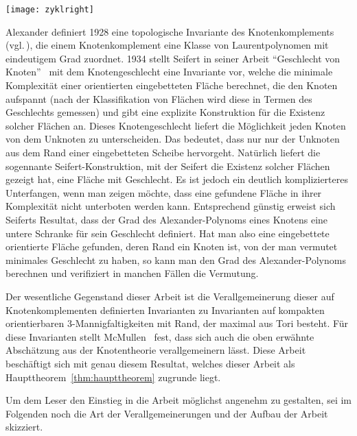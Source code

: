 	\hfill
	\begin{minipage}[t]{0.2\textwidth}
	\vfill \begin{flushright}
		\texttt{[image: zyklright]} 
	\end{flushright}
	\end{minipage}

	Alexander definiert 1928 eine topologische Invariante des Knotenkomplements (vgl.\,\cite{Alexander.1928}), die einem Knotenkomplement eine Klasse von Laurentpolynomen mit eindeutigem Grad zuordnet. 1934 stellt Seifert in seiner Arbeit "`Geschlecht von Knoten"'~\cite{Seifert.1934} mit dem Knotengeschlecht eine Invariante vor, welche die minimale Komplexität einer orientierten eingebetteten Fläche berechnet, die den Knoten aufspannt (nach der Klassifikation von Flächen wird diese in Termen des Geschlechts gemessen) und gibt eine explizite Konstruktion für die Existenz solcher Flächen an. Dieses Knotengeschlecht liefert die Möglichkeit jeden Knoten von dem Unknoten zu unterscheiden. Das bedeutet, dass nur nur der Unknoten aus dem Rand einer eingebetteten Scheibe hervorgeht. Natürlich liefert die sogennante Seifert-Konstruktion, mit der Seifert die Existenz solcher Flächen gezeigt hat, eine Fläche mit Geschlecht. Es ist jedoch ein deutlich komplizierteres Unterfangen, wenn man zeigen möchte, dass eine gefundene Fläche in ihrer Komplexität nicht unterboten werden kann. Entsprechend günstig erweist sich Seiferts Resultat, dass der Grad des Alexander-Polynoms eines Knotens eine untere Schranke für sein Geschlecht definiert. Hat man also eine eingebettete orientierte Fläche gefunden, deren Rand ein Knoten ist, von der man vermutet minimales Geschlecht zu haben, so kann man den Grad des Alexander-Polynoms berechnen und verifiziert in manchen Fällen die Vermutung.

	Der wesentliche Gegenstand dieser Arbeit ist die Verallgemeinerung dieser auf Knotenkomplementen definierten Invarianten zu Invarianten auf kompakten orientierbaren 3-Mannigfaltigkeiten mit Rand, der maximal aus Tori besteht. Für diese Invarianten stellt McMullen~\cite{MCMULLEN.2002} fest, dass sich auch die oben erwähnte Abschätzung aus der Knotentheorie verallgemeinern lässt. Diese Arbeit beschäftigt sich mit genau diesem Resultat, welches dieser Arbeit als Haupttheorem~\ref{thm:haupttheorem} zugrunde liegt.

	Um dem Leser den Einstieg in die Arbeit möglichst angenehm zu gestalten, sei im Folgenden noch die Art der Verallgemeinerungen und der Aufbau der Arbeit skizziert.

